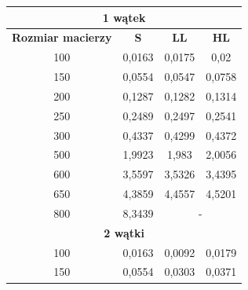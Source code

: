 \documentclass{report}
\begin{document}
\begin{table}[H]
	\centering
	\begin{tabular}{|cccc|}
		\hline
		\multicolumn{4}{|c|}{\textbf{1  wątek}}                                                                                            \\ \hline
		\multicolumn{1}{|c|}{\textbf{Rozmiar macierzy}} & \multicolumn{1}{c|}{\textbf{S}} & \multicolumn{1}{c|}{\textbf{LL}} & \textbf{HL} \\ \hline
		\multicolumn{1}{|c|}{100}                       & \multicolumn{1}{c|}{0,0163}     & \multicolumn{1}{c|}{0,0175}      & 0,02        \\ \hline
		\multicolumn{1}{|c|}{150}                       & \multicolumn{1}{c|}{0,0554}     & \multicolumn{1}{c|}{0,0547}      & 0,0758      \\ \hline
		\multicolumn{1}{|c|}{200}                       & \multicolumn{1}{c|}{0,1287}     & \multicolumn{1}{c|}{0,1282}      & 0,1314      \\ \hline
		\multicolumn{1}{|c|}{250}                       & \multicolumn{1}{c|}{0,2489}     & \multicolumn{1}{c|}{0,2497}      & 0,2541      \\ \hline
		\multicolumn{1}{|c|}{300}                       & \multicolumn{1}{c|}{0,4337}     & \multicolumn{1}{c|}{0,4299}      & 0,4372      \\ \hline
		\multicolumn{1}{|c|}{500}                       & \multicolumn{1}{c|}{1,9923}     & \multicolumn{1}{c|}{1,983}       & 2,0056      \\ \hline
		\multicolumn{1}{|c|}{600}                       & \multicolumn{1}{c|}{3,5597}     & \multicolumn{1}{c|}{3,5326}      & 3,4395      \\ \hline
		\multicolumn{1}{|c|}{650}                       & \multicolumn{1}{c|}{4,3859}     & \multicolumn{1}{c|}{4,4557}      & 4,5201      \\ \hline
		\multicolumn{1}{|c|}{800}                       & \multicolumn{1}{c|}{8,3439}     & \multicolumn{2}{c|}{-}                         \\ \hline
		\multicolumn{4}{|c|}{\textbf{2 wątki}}                                                                                             \\ \hline
		\multicolumn{1}{|c|}{100}                       & \multicolumn{1}{c|}{0,0163}     & \multicolumn{1}{c|}{0,0092}      & 0,0179      \\ \hline
		\multicolumn{1}{|c|}{150}                       & \multicolumn{1}{c|}{0,0554}     & \multicolumn{1}{c|}{0,0303}      & 0,0371      \\ \hline

\end{tabular}
\end{table}
\end{document}
